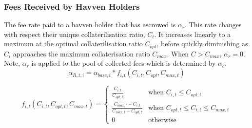 \begin{center}
\end{center}

\newpage
\subsubsection{Fees Received by Havven Holders}

\noindent The fee rate paid to a havven holder that has escrowed is $\alpha_r$. This rate changes with respect their unique collaterilisation ratio, $C_i$. It increases linearly to a maximum at the optimal collaterilisation ratio $C_{opt}$, before quickly diminishing as $C_i$ approaches the maximum collaterisation ratio $C_{max}$. When $C > C_{max}$, $\alpha_r = 0$. Note, $\alpha_r$ is applied to the pool of collected fees which is determined by $\alpha_c$. \\

\begin{equation}
\alpha_{R,t,i} = \alpha_{base,t} * f_{i,t}(C_{i,t}, C_{opt}, C_{max,t})  \label{eq:6}
\end{equation}

\begin{equation}
f_{i,t}(C_{i,t}, C_{opt,t}, C_{max,t}) = 
\begin{cases}
 \frac{C_{i,t}}{C_{opt,t}} &\mbox{when } C_{i,t} \leq C_{opt,t} \\[1em]
 \frac{C_{max,t} - C_{i,t}}{C_{max,t} - C_{opt,t}} &\mbox{when } C_{opt,t} \leq C_{i,t} \leq C_{max,t} \\[1em]
 0 &\mbox{otherwise}
 \end{cases}
 \label{eq:7}
\end{equation}

